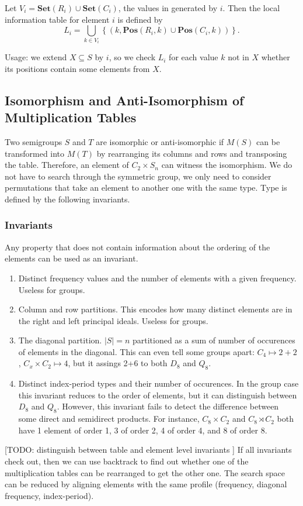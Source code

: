 \documentclass{amsart}
\newcommand{\Set}{\mathbf{Set}}
\newcommand{\Pos}{\mathbf{Pos}}
\newcommand{\todo}[1]{ \small \textsf{[TODO:  #1 ]} \normalsize}
\theoremstyle{plain}
\theoremstyle{definition}
\begin{document}
Let $V_i=\Set(R_i)\cup\Set(C_i)$, the values in generated by $i$. Then the  local information table for element $i$ is defined by
$$L_i=\bigcup_{k\in V_i}\left\{(k,\Pos(R_i,k)\cup\Pos(C_i,k))\right\}.$$

Usage: we extend $X\subseteq S$ by $i$, so we check $L_i$ for each value $k$ not in $X$ whether its positions contain some elements from $X$. 
\subsection{Isomorphism and Anti-Isomorphism of Multiplication Tables}
Two semigroups $S$ and $T$ are isomorphic or anti-isomorphic if $M(S)$ can be transformed into $M(T)$ by rearranging its columns and rows and transposing the table.
Therefore, an element of $C_2\times S_n$ can witness the isomorphism.
We do not have to search through the symmetric group, we only need to consider permutations that take an element to another one with the same type.
Type is defined by the following invariants.

\subsubsection{Invariants}
Any property that does not contain information about the ordering of the elements can be used as an invariant.
\begin{enumerate}
\item Distinct frequency values and the number of elements with a given frequency. Useless for groups.
\item Column and row partitions. This encodes how many distinct elements are in the right and left principal ideals. Useless for groups.
\item The diagonal partition. $|S|=n$ partitioned as a sum of number of occurences of elements in the diagonal. This can even tell some groups apart: $C_4\mapsto 2+2$, $C_x\times C_2\mapsto 4$, but it assings 2+6 to both $D_8$ and $Q_8$.
\item Distinct index-period types and their number of occurences. In the group case this invariant reduces to the order of elements, but it can distinguish between $D_8$ and $Q_8$. However, this invariant fails to detect the difference between some direct and semidirect products. For instance, $C_8\times C_2$ and $C_8\rtimes C_2$ both have 1 element of order 1, 3 of order 2, 4 of order 4, and 8 of order 8.
\end{enumerate} 
\todo{distinguish between table and element level invariants}
If all invariants check out, then we can use backtrack to find out whether one of the multiplication tables can be rearranged to get the other one.
The search space can be reduced by aligning elements with the same profile (frequency, diagonal frequency, index-period).
\end{document}
